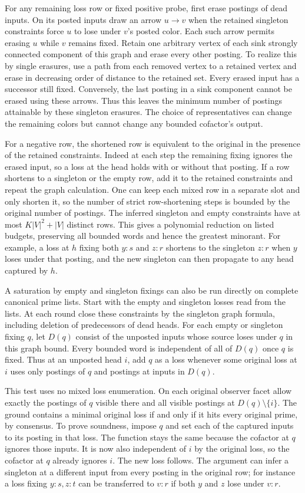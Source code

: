 For any remaining loss row or fixed positive probe,
first erase postings of dead inputs. On its posted
inputs draw an arrow $u\to v$ when the retained
singleton constraints force $u$ to lose under
$v$'s posted color. Each such arrow permits erasing
$u$ while $v$ remains fixed. Retain one arbitrary
vertex of each sink strongly connected component
of this graph and erase every other posting. To
realize this by single erasures, use a path from
each removed vertex to a retained vertex and erase
in decreasing order of distance to the retained set.
Every erased input has a successor still fixed.
Conversely, the last posting in a sink component
cannot be erased using these arrows. Thus this
leaves the minimum number of postings attainable
by these singleton erasures. The choice of
representatives can change the remaining colors
but cannot change any bounded cofactor's output.

For a negative row, the shortened row is equivalent
to the original in the presence of the retained
constraints. Indeed at each step the remaining
fixing ignores the erased input, so a loss at the
head holds with or without that posting. If a row
shortens to a singleton or the empty row, add it to
the retained constraints and repeat the graph
calculation. One can keep each mixed row in a
separate slot and only shorten it, so the number
of strict row-shortening steps is bounded by the
original number of postings. The inferred singleton
and empty constraints have at most $K|V|^2+|V|$
distinct rows. This gives a polynomial reduction
on listed budgets, preserving all bounded words
and hence the greatest minorant. For example, a
loss at $h$ fixing both $y:s$ and $z:r$ shortens
to the singleton $z:r$ when $y$ loses under that
posting, and the new singleton can then propagate
to any head captured by $h$.

A saturation by empty and singleton fixings can also
be run directly on complete canonical prime lists.
Start with the empty and singleton losses read from
the lists. At each round close these constraints by
the singleton graph formula, including deletion of
predecessors of dead heads. For each empty or singleton
fixing $q$, let $D(q)$ consist of the unposted inputs
whose source loses under $q$ in this graph bound.
Every bounded word is independent of all of $D(q)$
once $q$ is fixed. Thus at an unposted head $i$, add
$q$ as a loss whenever some original loss at $i$
uses only postings of $q$ and postings at inputs
in $D(q)$.

This test uses no mixed loss enumeration. On each
original observer facet allow exactly the postings
of $q$ visible there and all visible postings at
$D(q)\setminus\{i\}$. The ground contains a minimal
original loss if and only if it hits every original
prime, by consensus. To prove soundness, impose $q$
and set each of the captured inputs to its posting
in that loss. The function stays the same because
the cofactor at $q$ ignores those inputs. It is now
also independent of $i$ by the original loss, so
the cofactor at $q$ already ignores $i$. The new
loss follows. The argument can infer a singleton
at a different input from every posting in the
original row; for instance a loss fixing $y:s,z:t$
can be transferred to $v:r$ if both $y$ and $z$ lose
under $v:r$.

